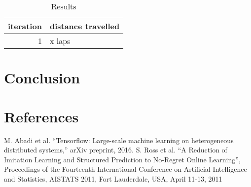 \documentclass[conference]{IEEEtran}
\begin{document}
\begin{table}[!t]
\renewcommand{\arraystretch}{1.3}
\caption{Results}
\centering
\begin{tabular}{r|l}
iteration&distance travelled\\
\hline
1&x laps\\
\end{tabular}
\label{tab:results}
\end{table}

\section{Conclusion}

\section*{References}

\begin{thebibliography}{00}
	
 M. Abadi et al. ``Tensorflow: Large-scale machine learning on heterogeneous distributed systems,'' arXiv preprint, 2016.
 S. Ross et al. ``A Reduction of Imitation Learning and Structured Prediction to No-Regret Online Learning'', Proceedings of the Fourteenth International Conference on Artificial Intelligence and Statistics, {AISTATS} 2011, Fort Lauderdale, USA, April 11-13, 2011
\end{thebibliography}
\end{document}
